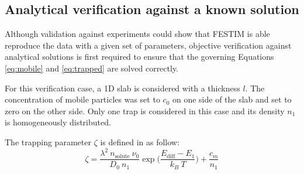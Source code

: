 
\subsection{Analytical verification against a known solution} \label{analytical}

Although validation against experiments could show that FESTIM is able reproduce the data with a given set of parameters, objective verification against analytical solutions is first required to ensure that the governing Equations \ref{eq:mobile} and \ref{eq:trapped} are solved correctly.

For this verification case, a 1D slab is considered with a thickness $l$.
The concentration of mobile particles was set to $c_0$ on one side of the slab and set to zero on the other side.
Only one trap is considered in this case and its density $n_1$ is homogeneously distributed.

The trapping parameter $\zeta$ is defined in  as follow:
\begin{equation}
    \zeta = \frac{\lambda^2 \: n_\mathrm{solute} \: \nu_0}{D_0 \: n_1}\exp\bigg(\frac{E_\mathrm{diff} - E_1}{k_B \: T}\bigg) + \frac{c_m}{n_1}
\end{equation}

